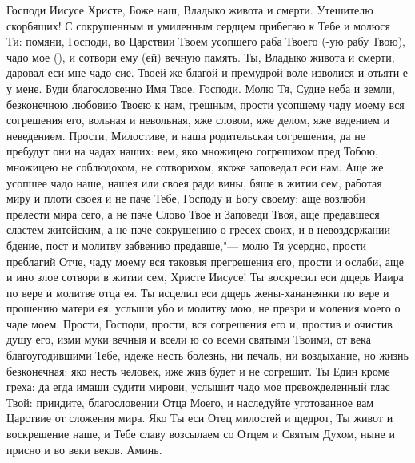 \begin{mymulticols}
 


Господи Иисусе Христе, Боже наш, Владыко живота и смерти. Утешителю скорбящих! С сокрушенным и умиленным сердцем прибегаю к Тебе и молюся Ти: помяни, Господи, во Царствии Твоем усопшего раба Твоего (-ую рабу Твою), чадо мое (), и сотвори ему (ей) вечную память. Ты, Владыко живота и смерти, даровал еси мне чадо сие. Твоей же благой и премудрой воле изволися и отьяти е у мене. Буди благословенно Имя Твое, Господи. Молю Тя, Судие неба и земли, безконечною любовию Твоею к нам, грешным, прости усопшему чаду моему вся согрешения его, вольная и невольная, яже словом, яже делом, яже ведением и неведением. Прости, Милостиве, и наша родительская согрешения, да не пребудут они на чадах наших: вем, яко множицею согрешихом пред Тобою, множицею не соблюдохом, не сотворихом, якоже заповедал еси нам. Аще же усопшее чадо наше, нашея или своея ради вины, бяше в житии сем, работая миру и плоти своея и не паче Тебе, Господу и Богу своему: аще возлюби прелести мира сего, а не паче Слово Твое и Заповеди Твоя, аще предавшеся сластем житейским, а не паче сокрушению о гресех своих, и в невоздержании бдение, пост и молитву забвению предавше,"--- молю Тя усердно, прости преблагий Отче, чаду моему вся таковыя прегрешения его, прости и ослаби, аще и ино злое сотвори в житии сем, Христе Иисусе! Ты воскресил еси дщерь Иаира по вере и молитве отца ея. Ты исцелил еси дщерь жены-хананеянки по вере и прошению матери ея: услыши убо и молитву мою, не презри и моления моего о чаде моем. Прости, Господи, прости, вся согрешения его и, простив и очистив душу его, изми муки вечныя и всели ю со всеми святыми Твоими, от века благоугодившими Тебе, идеже несть болезнь, ни печаль, ни воздыхание, но жизнь безконечная: яко несть человек, иже жив будет и не согрешит. Ты Един кроме греха: да егда имаши судити мирови, услышит чадо мое превожделенный глас Твой: приидите, благословении Отца Моего, и наследуйте уготованное вам Царствие от сложения мира. Яко Ты еси Отец милостей и щедрот, Ты живот и воскрешение наше, и Тебе славу возсылаем со Отцем и Святым Духом, ныне и присно и во веки веков. Аминь. 




\end{mymulticols}

\mychapterending


